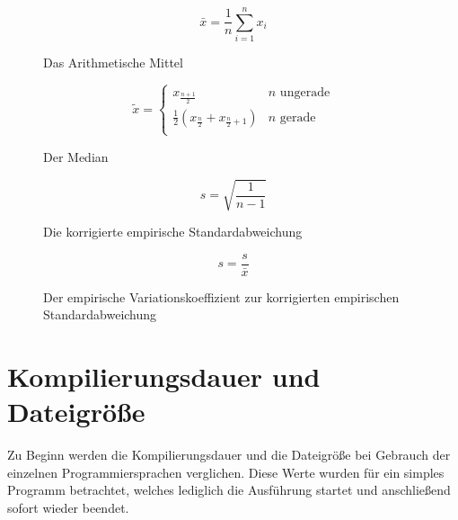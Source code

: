 \begin{figure}
	\caption{Das Arithmetische Mittel}
	\begin{equation}
		\label{formula:mean}
		\bar{x} = \frac{1}{n} \sum_{i=1}^n{x_i}
	\end{equation}
\end{figure}

\begin{figure}
	\caption{Der Median}
	\begin{equation}
		\label{formula:median}
		\tilde{x} =
		\begin{cases}
			x_{\frac{n + 1}{2}} & n \text{ ungerade} \\
			\frac{1}{2}(x_\frac{n}{2} + x_{\frac{n}{2} + 1}) & n \text{ gerade} \\
		\end{cases}
	\end{equation}
\end{figure}

\begin{figure}
	\caption{Die korrigierte empirische Standardabweichung}
	\begin{equation}
		\label{formula:std_deviation}
		s = \sqrt{\frac{1}{n - 1}}
	\end{equation}
\end{figure}

\begin{figure}
	\caption{Der empirische Variationskoeffizient zur korrigierten empirischen Standardabweichung}
	\begin{equation}
		\label{formula:variation_coefficient}
		s = \frac{s}{\bar{x}}
	\end{equation}
\end{figure}



\section{Kompilierungsdauer und Dateigröße}\label{sec:compile_time_filesize}

Zu Beginn werden die Kompilierungsdauer und die Dateigröße bei Gebrauch der einzelnen Programmiersprachen
verglichen. Diese Werte wurden für ein simples Programm betrachtet, welches lediglich die Ausführung startet und
anschließend sofort wieder beendet.

